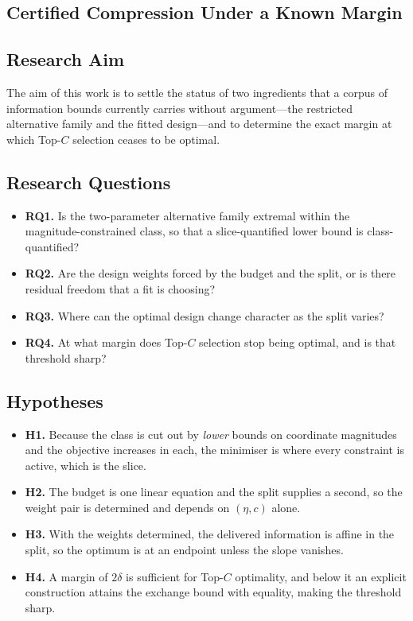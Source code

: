 \documentclass[conference]{IEEEtran}
\theoremstyle{definition}
\begin{document}
\subsection{Certified Compression Under a Known Margin}

\subsection{Research Aim}

The aim of this work is to settle the status of two ingredients that a corpus of information
bounds currently carries without argument---the restricted alternative family and the fitted
design---and to determine the exact margin at which Top-$C$ selection ceases to be optimal.

\subsection{Research Questions}

\begin{itemize}
\item \textbf{RQ1.} Is the two-parameter alternative family extremal within the
magnitude-constrained class, so that a slice-quantified lower bound is class-quantified?
\item \textbf{RQ2.} Are the design weights forced by the budget and the split, or is there
residual freedom that a fit is choosing?
\item \textbf{RQ3.} Where can the optimal design change character as the split varies?
\item \textbf{RQ4.} At what margin does Top-$C$ selection stop being optimal, and is that
threshold sharp?
\end{itemize}

\subsection{Hypotheses}

\begin{itemize}
\item \textbf{H1.} Because the class is cut out by \emph{lower} bounds on coordinate
magnitudes and the objective increases in each, the minimiser is where every constraint is
active, which is the slice.
\item \textbf{H2.} The budget is one linear equation and the split supplies a second, so the
weight pair is determined and depends on $(\eta,c)$ alone.
\item \textbf{H3.} With the weights determined, the delivered information is affine in the
split, so the optimum is at an endpoint unless the slope vanishes.
\item \textbf{H4.} A margin of $2\delta$ is sufficient for Top-$C$ optimality, and below it
an explicit construction attains the exchange bound with equality, making the threshold
sharp.
\end{itemize}
\end{document}
